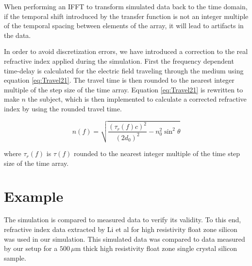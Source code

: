 When performing an IFFT to transform simulated data back to the time domain, if the temporal shift introduced by the transfer function is not an integer multiple of the temporal spacing between elements of the array, it will lead to artifacts in the data.

In order to avoid discretization errors, we have introduced a correction to the real refractive index applied during the simulation.
First the frequency dependent time-delay is calculated for the electric field traveling through the medium using equation \ref{eq:Travel21}. The travel time is then rounded to the nearest integer multiple of the step size of the time array. Equation \ref{eq:Travel21} is rewritten to make $n$ the subject, which is then implemented to calculate a corrected refractive index by using the rounded travel time.

\begin{equation}
n(f) = \sqrt{\frac{(\tau_{r}(f)c)^{2}}{(2d_{0})^{2}} - n_{0}^{2}\sin^{2}{\theta}}
\label{eq:ncor}
\end{equation}

where $\tau_{r}(f)$ is $\tau(f)$ rounded to the nearest integer multiple of the time step size of the time array.

\section{Example}
\label{sec:SimEx}

The simulation is compared to measured data to verify its validity. To this end, refractive index data extracted by Li et al \cite{Li-2008} for high resistivity float zone silicon was used in our simulation. This simulated data was compared to data measured by our setup for a $500\,\mu$m thick high resistivity float zone single crystal silicon sample.


